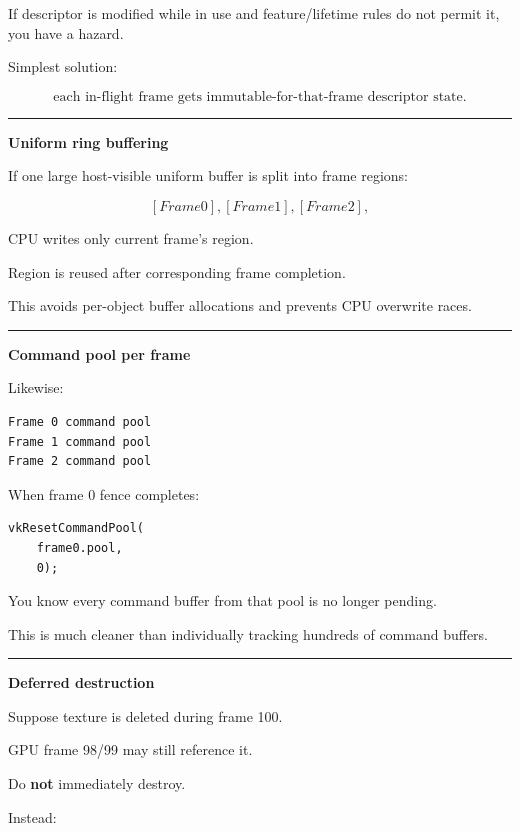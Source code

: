 If descriptor is modified while in use and feature/lifetime rules do not permit it, you have a hazard.

Simplest solution:

\[
\boxed{
\text{each in-flight frame gets immutable-for-that-frame descriptor state}.
}
\]

\begin{center}\rule{0.5\linewidth}{0.5pt}\end{center}

\textbf{Uniform ring buffering}

If one large host-visible uniform buffer is split into frame regions:

\[
[Frame0],
[Frame1],
[Frame2],
\]

CPU writes only current frame's region.

Region is reused after corresponding frame completion.

This avoids per-object buffer allocations and prevents CPU overwrite races.

\begin{center}\rule{0.5\linewidth}{0.5pt}\end{center}

\textbf{Command pool per frame}

Likewise:

\begin{verbatim}
Frame 0 command pool
Frame 1 command pool
Frame 2 command pool
\end{verbatim}

When frame 0 fence completes:

\begin{verbatim}
vkResetCommandPool(
    frame0.pool,
    0);
\end{verbatim}

You know every command buffer from that pool is no longer pending.

This is much cleaner than individually tracking hundreds of command buffers.

\begin{center}\rule{0.5\linewidth}{0.5pt}\end{center}

\textbf{Deferred destruction}

Suppose texture is deleted during frame 100.

GPU frame 98/99 may still reference it.

Do \textbf{not} immediately destroy.

Instead:

